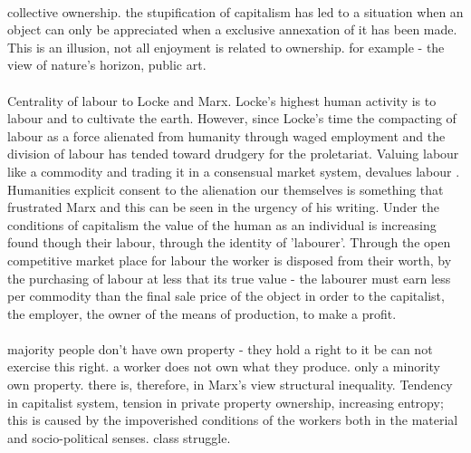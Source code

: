 
\paragraph{}collective ownership. the stupification of capitalism has led to a situation when an object can only be appreciated when a exclusive annexation of it has been made. This is an illusion, not all enjoyment is related to ownership. for example - the view of nature's horizon, public art.

\paragraph{}Centrality of labour to Locke and Marx. Locke's highest human activity is to labour and to cultivate the earth. However, since Locke's time the compacting of labour as a force alienated from humanity through waged employment and the division of labour has tended toward drudgery for the proletariat. Valuing labour like a commodity and trading it in a consensual market system, devalues labour \cite[pp. 12]{Marx:2004yu}. Humanities explicit consent to the alienation our themselves is something that frustrated Marx and this can be seen in the urgency of his writing. Under the conditions of capitalism the value of the human as an individual is increasing found though their labour, through the identity of 'labourer'. Through the open competitive market place for labour the worker is disposed from their worth, by the purchasing of labour at less that its true value - the labourer must earn less per commodity than the final sale price of the object in order to the capitalist, the employer, the owner of the means of production, to make a profit.

\paragraph{}majority people don't have own property - they hold a right to it be can not exercise this right. a worker does not own what they produce. only a minority own property. there is, therefore, in Marx's view structural inequality. Tendency in capitalist system, tension in private property ownership, increasing entropy; this is caused by the impoverished conditions of the workers both in the material and socio-political senses. class struggle.

